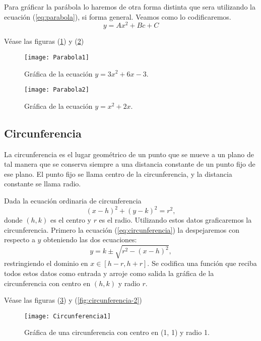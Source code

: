 \documentclass[12pt,a4paper]{article}
\begin{document}
Para gráficar la parábola lo haremos de otra forma distinta que sera utilizando la ecuación (\ref{eq:parabola}), si forma general. Veamos como lo codificaremos.
\begin{equation}
y = Ax^2 + Bc + C \label{eq:parabola}
\end{equation}

Véase las figuras (\ref{fig:parabola-1}) y (\ref{fig:parabola-2})

\begin{figure}
\centering
\texttt{[image: Parabola1]}
\caption{Gráfica de la ecuación $y = 3x^2 + 6x - 3$.}
\label{fig:parabola-1}
\end{figure}

\begin{figure}
\centering
\texttt{[image: Parabola2]}
\caption{Gráfica de la ecuación $y = x^2 + 2x$.}
\label{fig:parabola-2}
\end{figure}


\newpage
\subsection{Circunferencia} \label{subsec:circunferencia}

La circunferencia es el lugar geométrico de un punto que se mueve a un plano de tal manera que se conserva siempre a una distancia constante de un punto fijo de ese plano. El punto fijo se llama centro de la circunferencia, y la distancia constante se llama radio.

Dada la ecuación ordinaria de circunferencia
\begin{equation}
(x - h)^2 + (y - k)^2 = r^2, \label{eq:circunferencia}
\end{equation}
donde $(h, k)$ es el centro y $r$ es el radio. Utilizando estos datos graficaremos la circunferencia. Primero la ecuación (\ref{eq:circunferencia}) la despejaremos con respecto a $y$ obteniendo las dos ecuaciones:
\begin{equation}
y = k \pm \sqrt{r^2 - (x - h)^2}, \label{eq:circdespejada}
\end{equation}
restringiendo el dominio en $x \in [h - r, h + r]$. Se codifica una función que reciba todos estos datos como entrada y arroje como salida la gráfica de la circunferencia con centro en $(h, k)$ y radio $r$.

Véase las figuras (\ref{fig:circunferencia-1}) y (\ref{fig:circunferencia-2})

\begin{figure}
\centering
\texttt{[image: Circunferencia1]}
\caption{Gráfica de una circunferencia con centro en (1, 1) y radio 1.}
\label{fig:circunferencia-1}
\end{figure}
\end{document}

